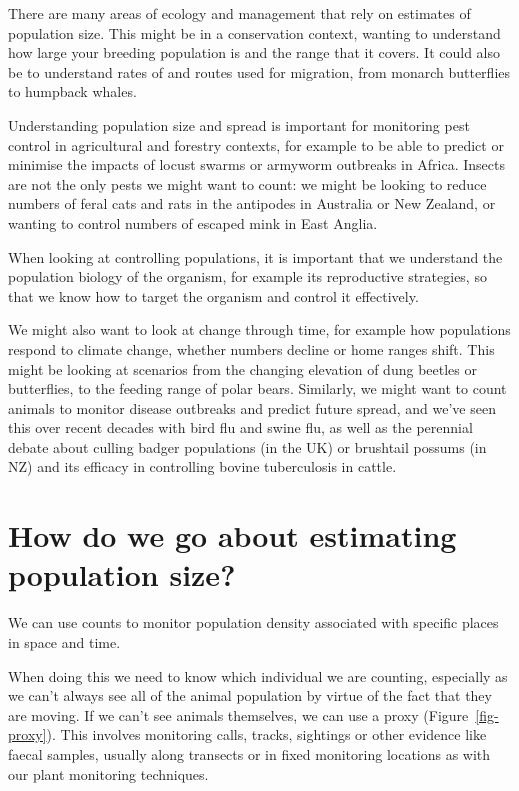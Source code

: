 \documentclass[
  letterpaper,
  DIV=11,
  numbers=noendperiod]{scrreprt}
\begin{document}
There are many areas of ecology and management that rely on estimates of
population size. This might be in a conservation context, wanting to
understand how large your breeding population is and the range that it
covers. It could also be to understand rates of and routes used for
migration, from monarch butterflies to humpback whales.

Understanding population size and spread is important for monitoring
pest control in agricultural and forestry contexts, for example to be
able to predict or minimise the impacts of locust swarms or armyworm
outbreaks in Africa. Insects are not the only pests we might want to
count: we might be looking to reduce numbers of feral cats and rats in
the antipodes in Australia or New Zealand, or wanting to control numbers
of escaped mink in East Anglia.

When looking at controlling populations, it is important that we
understand the population biology of the organism, for example its
reproductive strategies, so that we know how to target the organism and
control it effectively.

We might also want to look at change through time, for example how
populations respond to climate change, whether numbers decline or home
ranges shift. This might be looking at scenarios from the changing
elevation of dung beetles or butterflies, to the feeding range of polar
bears. Similarly, we might want to count animals to monitor disease
outbreaks and predict future spread, and we've seen this over recent
decades with bird flu and swine flu, as well as the perennial debate
about culling badger populations (in the UK) or brushtail possums (in
NZ) and its efficacy in controlling bovine tuberculosis in cattle.

\section{How do we go about estimating population
size?}\label{how-do-we-go-about-estimating-population-size}

We can use counts to monitor population density associated with specific
places in space and time.

When doing this we need to know which individual we are counting,
especially as we can't always see all of the animal population by virtue
of the fact that they are moving. If we can't see animals themselves, we
can use a proxy (Figure~\ref{fig-proxy}). This involves monitoring
calls, tracks, sightings or other evidence like faecal samples, usually
along transects or in fixed monitoring locations as with our plant
monitoring techniques.
\end{document}
